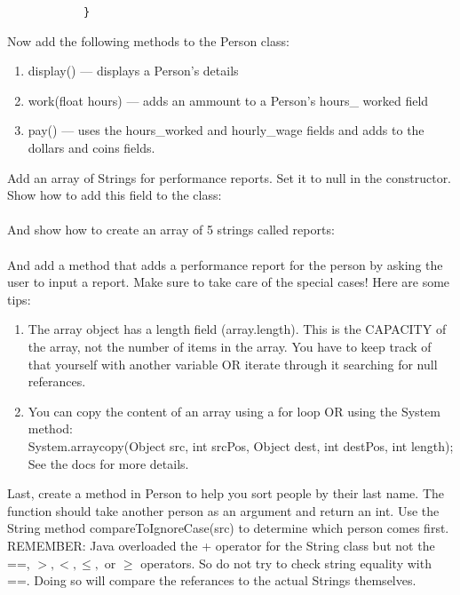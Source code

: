 \documentclass[../../main.tex]{subfiles}
\begin{document}
\begin{steps}
      \begin{verbatim}
            }
      \end{verbatim}
      \item Now add the following methods to the Person class:
         \begin{enumerate}[label=\Alph*.]
            \item display() --- displays a Person's details
            \item work(float hours) --- adds an ammount to a Person's hours_
               worked field
            \item pay() --- uses the hours_worked and hourly_wage
               fields and adds to the dollars and coins fields.
         \end{enumerate}
      \item Add an array of Strings for performance reports.  Set it to null in the constructor.
         Show how to add this field to the class:
         \vspace{.5cm}\\
         \underline{\hspace{15cm}}\\
         And show how to create an array of 5 strings called reports:
         \vspace{.5cm}\\
         \underline{\hspace{15cm}}\\
         And add a method that adds a performance report for the person by asking the user to
         input a report. Make sure to take care of the special cases! Here are some tips:
         \begin{enumerate}[label=\Alph*.]
            \item The array object has a length field (array.length). This is the CAPACITY
               of the array, not the number of items in the array. You have to keep track
               of that yourself with another variable OR iterate through it searching for
               null referances.
            \item You can copy the content of an array using a for loop OR using the System
               method:\\
               System.arraycopy(Object src, int srcPos, Object dest, int destPos, int length);\\
               See the docs for more details.
         \end{enumerate} 
      \item Last, create a method in Person to help you sort people by their last name.
         The function should take another person as an argument and return an int.
         Use the String method
         compareToIgnoreCase(src) to determine which person comes first.\\
            REMEMBER: Java overloaded the + operator for the String class but not the ==,
            $>, <, \leq,$ or $\geq$ operators. So do not try to check string equality with ==.
            Doing so will compare the referances to the actual Strings themselves.
   \end{steps}
   
\end{document}
